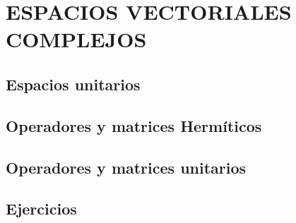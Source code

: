 \chapter[ESPACIOS VECTORIALES COMPLEJOS]{ESPACIOS VECTORIALES \\ COMPLEJOS}\label{chap:espacios_complejos}
\printchaptertableofcontents

\section{Espacios unitarios}

\section{Operadores y matrices Hermíticos}

\section{Operadores y matrices unitarios}

\section{Ejercicios}